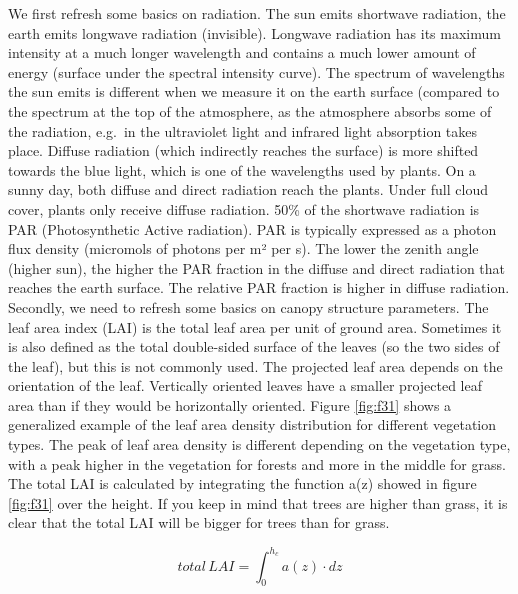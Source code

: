 \documentclass[12pt,oneside]{book}
\begin{document}
We first refresh some basics on radiation. The sun emits shortwave
radiation, the earth emits longwave radiation (invisible). Longwave
radiation has its maximum intensity at a much longer wavelength and
contains a much lower amount of energy (surface under the spectral
intensity curve). The spectrum of wavelengths the sun emits is different
when we measure it on the earth surface (compared to the spectrum at the
top of the atmosphere, as the atmosphere absorbs some of the radiation,
e.g.~in the ultraviolet light and infrared light absorption takes place.
Diffuse radiation (which indirectly reaches the surface) is more shifted
towards the blue light, which is one of the wavelengths used by plants.
On a sunny day, both diffuse and direct radiation reach the plants.
Under full cloud cover, plants only receive diffuse radiation. 50\% of
the shortwave radiation is PAR (Photosynthetic Active radiation). PAR is
typically expressed as a photon flux density (micromols of photons per
m² per s). The lower the zenith angle (higher sun), the higher the PAR
fraction in the diffuse and direct radiation that reaches the earth
surface. The relative PAR fraction is higher in diffuse radiation.
Secondly, we need to refresh some basics on canopy structure parameters.
The leaf area index (LAI) is the total leaf area per unit of ground
area. Sometimes it is also defined as the total double-sided surface of
the leaves (so the two sides of the leaf), but this is not commonly
used. The projected leaf area depends on the orientation of the leaf.
Vertically oriented leaves have a smaller projected leaf area than if
they would be horizontally oriented. Figure \ref{fig:f31} shows a
generalized example of the leaf area density distribution for different
vegetation types. The peak of leaf area density is different depending
on the vegetation type, with a peak higher in the vegetation for forests
and more in the middle for grass. The total LAI is calculated by
integrating the function a(z) showed in figure \ref{fig:f31} over the
height. If you keep in mind that trees are higher than grass, it is
clear that the total LAI will be bigger for trees than for grass.

\[
total \, LAI = \int_0^{h_c}a(z) \cdot dz
\]
\end{document}

